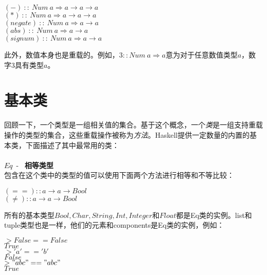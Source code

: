 \noindent\hspace*{1cm} $(-)~::~Num~a \Rightarrow  a \rightarrow a \rightarrow a$\\
\hspace*{1cm} $(*)~::~Num~a \Rightarrow  a \rightarrow a \rightarrow a$\\
\hspace*{1cm} $(negate)~::~Num~a \Rightarrow  a \rightarrow a$\\
\hspace*{1cm} $(abs)~::~Num~a \Rightarrow  a \rightarrow a$\\
\hspace*{1cm} $(signum)~::~Num~a \Rightarrow  a \rightarrow a$

此外，数值本身也是重载的。例如，$3::Num~a \Rightarrow a$意为对于任意数值类型$a$，数字3具有类型$a$。

\section{基本类}
回顾一下，一个类型是一组相关值的集合。基于这个概念，一个\textit{类}是一组支持重载操作的类型的集合，这些重载操作被称为\textit{方法}。Haskell提供一定数量的内置的基本类，下面描述了其中最常用的类：
\\
\\
$Eq$~-~ \textbf{相等类型}\\
包含在这个类中的类型的值可以使用下面两个方法进行相等和不等比较：

\noindent\hspace*{1cm} $(==) :: a \rightarrow a \rightarrow Bool$\\
\hspace*{1cm} $(\neq) :: a \rightarrow a \rightarrow Bool$

所有的基本类型$Bool, Char, String, Int,
Integer$和$Float$都是Eq类的实例。list和tuple类型也是一样，他们的元素和components是Eq类的实例，例如：

\noindent\hspace*{1cm} $> False == False$\\
\hspace*{1cm} $True$\\

\noindent\hspace*{1cm} $>'a' == 'b'$\\
\hspace*{1cm} $False$\\

\noindent\hspace*{1cm} $> "abc" == "abc"$\\
\hspace*{1cm} $True$\\

